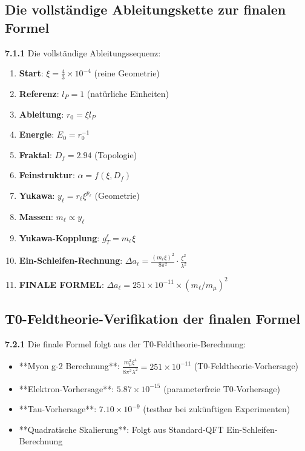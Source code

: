 \documentclass[12pt,a4paper]{article}
\newcommand{\lP}{l_P}
\newcommand{\rzero}{r_0}
\newcommand{\Ezero}{E_0}
\newcommand{\xipar}{\xi}
\begin{document}
	\subsection{Die vollständige Ableitungskette zur finalen Formel}
	
	\noindent \textbf{7.1.1} Die vollständige Ableitungssequenz:
	\begin{enumerate}
		\item \textbf{Start}: $\xipar = \frac{4}{3} \times 10^{-4}$ (reine Geometrie)
		\item \textbf{Referenz}: $\lP = 1$ (natürliche Einheiten)
		\item \textbf{Ableitung}: $\rzero = \xipar \lP$
		\item \textbf{Energie}: $\Ezero = \rzero^{-1}$
		\item \textbf{Fraktal}: $D_f = 2.94$ (Topologie)
		\item \textbf{Feinstruktur}: $\alpha = f(\xipar, D_f)$
		\item \textbf{Yukawa}: $y_\ell = r_\ell \xipar^{p_\ell}$ (Geometrie)
		\item \textbf{Massen}: $m_\ell \propto y_\ell$
		\item \textbf{Yukawa-Kopplung}: $g_T^\ell = m_\ell \xi$
		\item \textbf{Ein-Schleifen-Rechnung}: $\Delta a_\ell = \frac{(m_\ell \xi)^2}{8\pi^2} \cdot \frac{\xi^2}{\lambda^2}$
		\item \textbf{FINALE FORMEL}: $\Delta a_\ell = 251 \times 10^{-11} \times (m_\ell/m_\mu)^2$
	\end{enumerate}
	
	\subsection{T0-Feldtheorie-Verifikation der finalen Formel}
	
	\noindent \textbf{7.2.1} Die finale Formel folgt aus der T0-Feldtheorie-Berechnung:
	\begin{itemize}
		\item **Myon g-2 Berechnung**: $\frac{m_\mu^2 \xi^4}{8\pi^2 \lambda^2} = 251 \times 10^{-11}$ (T0-Feldtheorie-Vorhersage)
		\item **Elektron-Vorhersage**: $5.87 \times 10^{-15}$ (parameterfreie T0-Vorhersage)
		\item **Tau-Vorhersage**: $7.10 \times 10^{-9}$ (testbar bei zukünftigen Experimenten)
		\item **Quadratische Skalierung**: Folgt aus Standard-QFT Ein-Schleifen-Berechnung
	\end{itemize}
	
\end{document}
